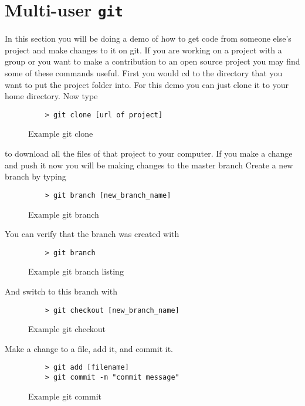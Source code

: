 \documentclass[11pt]{report}
\begin{document}
\chapter{Multi-user \texttt{git}}
In this section you will be doing a demo of how to get code from
someone else's project and make changes to it on git. If you are
working on a project with a group or you want to make a contribution
to an open source project you may find some of these commands useful.
First you would cd to the directory that you want to put the project
folder into.  For this demo you can just clone it to your home
directory.  Now type
\begin{figure}[H]
  \caption{Example git clone}
  \begin{lstlisting}
    > git clone [url of project]
  \end{lstlisting}
\end{figure}


to download all the files of that project to your computer.  If you
make a change and push it now you will be making changes to the master
branch Create a new branch by typing

\begin{figure}[H]
  \caption{Example git branch}
  \begin{lstlisting}
    > git branch [new_branch_name]
  \end{lstlisting}
\end{figure}

You can verify that the branch was created with

\begin{figure}[H]
  \caption{Example git branch listing}
  \begin{lstlisting}
    > git branch
  \end{lstlisting}
\end{figure}

And switch to this branch with

\begin{figure}[H]
  \caption{Example git checkout}
  \begin{lstlisting}
    > git checkout [new_branch_name]
  \end{lstlisting}
\end{figure}

Make a change to a file, add it, and commit it.

\begin{figure}[H]
  \caption{Example git commit}
  \begin{lstlisting}
    > git add [filename]
    > git commit -m "commit message"
    \end{lstlisting}
\end{figure}
\end{document}
